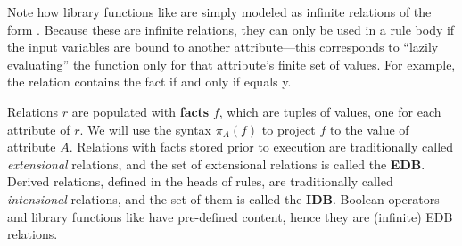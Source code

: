 Note how library functions like  are simply modeled as infinite relations of the form .
Because these are infinite relations, they can only be used in a rule body if the input variables are bound to another attribute---this corresponds to ``lazily evaluating'' the function only for that attribute's finite set of values.
For example, the relation  contains the fact  if and only if  equals {y}.

Relations $r$ are populated with \textbf{facts} $f$, which are tuples of values, one for each attribute of $r$.
We will use the syntax $\pi_A(f)$ to project $f$ to the value of attribute $A$.
Relations with facts stored prior to execution are traditionally called \emph{extensional} relations, and the set of extensional relations is called the \textbf{EDB}. Derived relations, defined in the heads of rules, are traditionally called \emph{intensional} relations, and the set of them is called the \textbf{IDB}.
Boolean operators and library functions like  have pre-defined content, hence they are (infinite) EDB relations.


